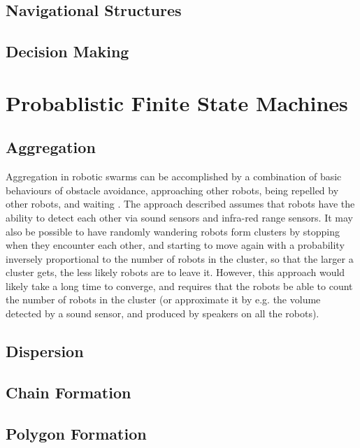 \documentclass[]{article}
\begin{document}
\subsection{Navigational Structures}

\subsection{Decision Making}

\section{Probablistic Finite State Machines}

\subsection{Aggregation}

Aggregation in robotic swarms can be accomplished by a combination of basic behaviours of obstacle avoidance, approaching other robots, being repelled by other robots, and waiting \cite{soysal2005probabilistic}.
The approach described assumes that robots have the ability to detect each other via sound sensors and infra-red range sensors. 
It may also be possible to have randomly wandering robots form clusters by stopping when they encounter each other, and starting to move again with a probability inversely proportional to the number of robots in the cluster, so that the larger a cluster gets, the less likely robots are to leave it. 
However, this approach would likely take a long time to converge, and requires that the robots be able to count the number of robots in the cluster (or approximate it by e.g. the volume detected by a sound sensor, and produced by speakers on all the robots).

\subsection{Dispersion}

\subsection{Chain Formation}

\cite{nouyan2008path} 

\subsection{Polygon Formation}
\end{document}
